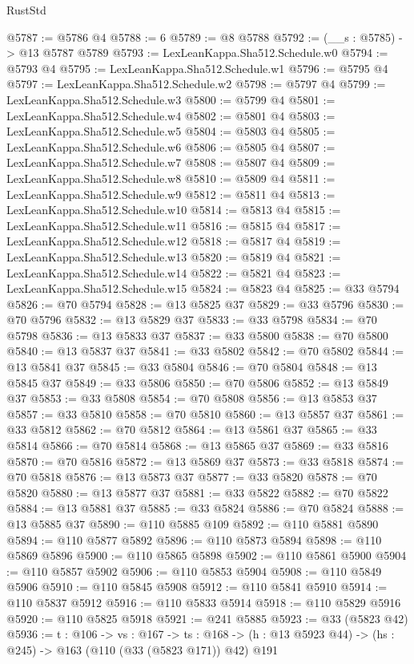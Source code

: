 \begin{lexlean}{RustStd}
\begin{coremodule}
@5787 := @5786 @4
@5788 := 6
@5789 := @8 @5788
@5792 := (__s : @5785) -> @13 @5787 @5789
@5793 := LexLeanKappa.Sha512.Schedule.w0
@5794 := @5793 @4
@5795 := LexLeanKappa.Sha512.Schedule.w1
@5796 := @5795 @4
@5797 := LexLeanKappa.Sha512.Schedule.w2
@5798 := @5797 @4
@5799 := LexLeanKappa.Sha512.Schedule.w3
@5800 := @5799 @4
@5801 := LexLeanKappa.Sha512.Schedule.w4
@5802 := @5801 @4
@5803 := LexLeanKappa.Sha512.Schedule.w5
@5804 := @5803 @4
@5805 := LexLeanKappa.Sha512.Schedule.w6
@5806 := @5805 @4
@5807 := LexLeanKappa.Sha512.Schedule.w7
@5808 := @5807 @4
@5809 := LexLeanKappa.Sha512.Schedule.w8
@5810 := @5809 @4
@5811 := LexLeanKappa.Sha512.Schedule.w9
@5812 := @5811 @4
@5813 := LexLeanKappa.Sha512.Schedule.w10
@5814 := @5813 @4
@5815 := LexLeanKappa.Sha512.Schedule.w11
@5816 := @5815 @4
@5817 := LexLeanKappa.Sha512.Schedule.w12
@5818 := @5817 @4
@5819 := LexLeanKappa.Sha512.Schedule.w13
@5820 := @5819 @4
@5821 := LexLeanKappa.Sha512.Schedule.w14
@5822 := @5821 @4
@5823 := LexLeanKappa.Sha512.Schedule.w15
@5824 := @5823 @4
@5825 := @33 @5794
@5826 := @70 @5794
@5828 := @13 @5825 @37
@5829 := @33 @5796
@5830 := @70 @5796
@5832 := @13 @5829 @37
@5833 := @33 @5798
@5834 := @70 @5798
@5836 := @13 @5833 @37
@5837 := @33 @5800
@5838 := @70 @5800
@5840 := @13 @5837 @37
@5841 := @33 @5802
@5842 := @70 @5802
@5844 := @13 @5841 @37
@5845 := @33 @5804
@5846 := @70 @5804
@5848 := @13 @5845 @37
@5849 := @33 @5806
@5850 := @70 @5806
@5852 := @13 @5849 @37
@5853 := @33 @5808
@5854 := @70 @5808
@5856 := @13 @5853 @37
@5857 := @33 @5810
@5858 := @70 @5810
@5860 := @13 @5857 @37
@5861 := @33 @5812
@5862 := @70 @5812
@5864 := @13 @5861 @37
@5865 := @33 @5814
@5866 := @70 @5814
@5868 := @13 @5865 @37
@5869 := @33 @5816
@5870 := @70 @5816
@5872 := @13 @5869 @37
@5873 := @33 @5818
@5874 := @70 @5818
@5876 := @13 @5873 @37
@5877 := @33 @5820
@5878 := @70 @5820
@5880 := @13 @5877 @37
@5881 := @33 @5822
@5882 := @70 @5822
@5884 := @13 @5881 @37
@5885 := @33 @5824
@5886 := @70 @5824
@5888 := @13 @5885 @37
@5890 := @110 @5885 @109
@5892 := @110 @5881 @5890
@5894 := @110 @5877 @5892
@5896 := @110 @5873 @5894
@5898 := @110 @5869 @5896
@5900 := @110 @5865 @5898
@5902 := @110 @5861 @5900
@5904 := @110 @5857 @5902
@5906 := @110 @5853 @5904
@5908 := @110 @5849 @5906
@5910 := @110 @5845 @5908
@5912 := @110 @5841 @5910
@5914 := @110 @5837 @5912
@5916 := @110 @5833 @5914
@5918 := @110 @5829 @5916
@5920 := @110 @5825 @5918
@5921 := @241 @5885
@5923 := @33 (@5823 @42)
@5936 := {t : @106} ->
  {vs : @167} ->
  {ts : @168} -> (h : @13 @5923 @44) -> (hs : @245) -> @163 (@110 (@33 (@5823 @171)) @42) @191

\end{coremodule}
\end{lexlean}
